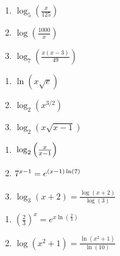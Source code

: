 \documentclass{ximera}
\begin{document}
\begin{multicols}{3}
\begin{enumerate}
\setcounter{enumi}{\value{HW}}

\item $\log_{5}\left(\frac{x}{125}\right)$
\item $\log\left(\frac{1000}{x}\right)$
\item $\log_{7}\left(\frac{x(x - 3)}{49}\right)$

\setcounter{HW}{\value{enumi}}
\end{enumerate}
\end{multicols}

\begin{multicols}{3}
\begin{enumerate}
\setcounter{enumi}{\value{HW}}

\item $\ln \left(x \sqrt{e} \right)$
\item $\log_{2}\left(x^{3/2}\right)$
\item $\log_{2}\left(x \sqrt{x-1}\right)$


\setcounter{HW}{\value{enumi}}
\end{enumerate}
\end{multicols}


\begin{multicols}{3}
\begin{enumerate}
\setcounter{enumi}{\value{HW}}
\item $\vphantom{\frac{\log(x + 2)}{\log(3)}}\log_{2}\left(\frac{x}{x - 1}\right)$ 
\item $\vphantom{\frac{\log(x + 2)}{\log(3)}}7^{x - 1} = e^{(x - 1)\ln(7)}$
\item $\log_{3}(x + 2) = \frac{\log(x + 2)}{\log(3)}$


\setcounter{HW}{\value{enumi}}
\end{enumerate}
\end{multicols}


\begin{multicols}{2}
\begin{enumerate}
\setcounter{enumi}{\value{HW}}

\item $\left(\frac{2}{3}\right)^{x} = e^{x\ln(\frac{2}{3})}$
\item $\log(x^{2} + 1) = \frac{\ln(x^{2} + 1)}{\ln(10)}$

\setcounter{HW}{\value{enumi}}
\end{enumerate}
\end{multicols}
\end{document}
